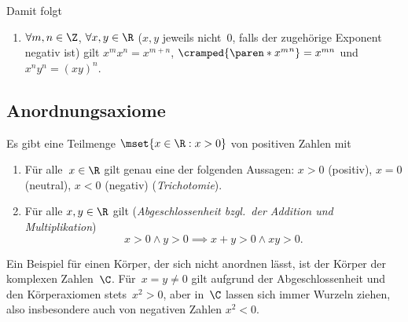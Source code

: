 \documentclass[a4paper]{article}
\begin{document}
Damit folgt
\begin{enumerate}[resume*=conclusions]
    \item $\forall m, n \in \Z$, $\forall x, y \in \R$ ($x, y$ jeweils nicht~0, falls der zugehörige Exponent negativ ist) gilt $x^m x^n = x^{m+n}$, $\cramped{\paren*{x^m}^n} = x^{mn}$ und $x^n y^n = (xy)^n$.
\end{enumerate}

\subsection{Anordnungsaxiome}

\begin{axiom}[Anordnungsaxiome]
    Es gibt eine Teilmenge $\mset{x \in \R : x > 0}$ von positiven Zahlen mit
    \begin{enumerate}[resume*=axioms]
        \item Für alle~$x \in \R$ gilt genau eine der folgenden Aussagen: $x > 0$ (positiv), $x = 0$ (neutral), $x < 0$ (negativ) (\emph{Trichotomie}).
        \item Für alle $x, y \in \R$ gilt (\emph{Abgeschlossenheit bzgl.\ der Addition und Multiplikation})
              \begin{equation*}
                  x > 0 \wedge y > 0 \implies x + y > 0 \wedge x y > 0.
              \end{equation*}\label{ax:oc}
    \end{enumerate}
\end{axiom}

Ein Beispiel für einen Körper, der sich nicht anordnen lässt, ist der Körper der komplexen Zahlen~$\C$. Für~$x = y \neq 0$ gilt aufgrund der Abgeschlossenheit und den Körperaxiomen stets~$x^2 > 0$, aber in~$\C$ lassen sich immer Wurzeln ziehen, also insbesondere auch von negativen Zahlen $x^2 < 0$.
\end{document}
